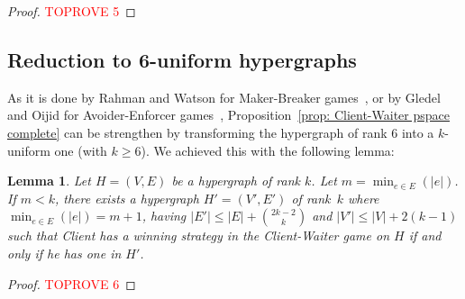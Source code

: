 \documentclass{article}
\newcommand{\hyp}{H}
\newcommand{\WS}{E}
\newcommand{\som}{V}
\newcommand{\hxf}{\hyp = (\som, \WS)}
\newtheorem{lemma}[theorem]{Lemma}
\begin{document}
\begin{proof}\textcolor{red}{TOPROVE 5}\end{proof}


\subsection{Reduction to 6-uniform hypergraphs} \label{subsection conclusion}

As it is done by Rahman and Watson for Maker-Breaker games~\cite{RW21}, or by Gledel and Oijid for Avoider-Enforcer games~\cite{GO23}, Proposition~\ref{prop: Client-Waiter pspace complete} can be strengthen by transforming the hypergraph of rank \(6\) into a \(k\)-uniform one (with \(k \ge 6\)). We achieved this with the following lemma:

\begin{lemma}\label{to 6uniform Client-Waiter}
    Let $\hxf$ be a hypergraph of rank $k$. Let $m = \min_{e\in E} (|e|)$. If $m <k$, there exists a hypergraph $\hyp'= (\som',\WS')$ of rank~$k$ where $\min_{e\in E} (|e|) = m+1$, having $|\WS'|\le |\WS| + \binom{2k-2}{k}$ and $|\som'| \le |\som| + 2(k-1)$ such that Client has a winning strategy in the Client-Waiter game on $\hyp$ if and only if he has one in $\hyp'$.
\end{lemma}

\begin{proof}\textcolor{red}{TOPROVE 6}\end{proof}
\end{document}
